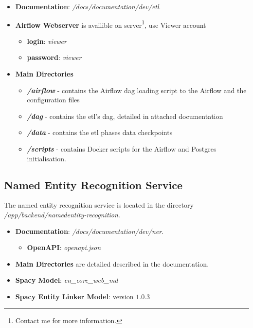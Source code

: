 \begin{itemize}
    \item \textbf{Documentation}: \textit{/docs/documentation/dev/etl}.
    \item \textbf{Airflow Webserver} is availible on server\footnote{Contact me for more information.}, use Viewer account 
    \begin{itemize}
        \item \textbf{login}: \textit{viewer}
        \item \textbf{password}: \textit{viewer}
    \end{itemize}
    \item \textbf{Main Directories}
    \begin{itemize}
        \item \textbf{\textit{/airflow}} - contains the Airflow \acrshort{dag} loading script to the Airflow and the configuration files
        \item \textbf{\textit{/dag}} - contains the \acrshort{etl}'s \acrshort{dag}, detailed in attached documentation
        \item \textbf{\textit{/data}} - contains the \acrshort{etl} phases data checkpoints
        \item \textbf{\textit{/scripts}} - contains Docker scripts for the Airflow and Postgres initialisation.
    \end{itemize}
\end{itemize}

\subsection{Named Entity Recognition Service}
\label{subsec:development-ner}
The named entity recognition service is located in the directory \textit{/app/backend/named}\textit{entity-recognition}.

\begin{itemize}
    \item \textbf{Documentation}: \textit{/docs/documentation/dev/ner}.
    \begin{itemize}
        \item \textbf{OpenAPI}: \textit{openapi.json}
    \end{itemize}
    \item \textbf{Main Directories} are detailed described in the documentation.
    \item \textbf{Spacy Model}: \textit{en\_core\_web\_md}
    \item \textbf{Spacy Entity Linker Model}: version $1.0.3$
\end{itemize}

